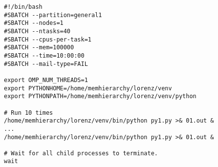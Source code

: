 \begin{lstlisting}[style=bsh]
#!/bin/bash
#SBATCH --partition=general1
#SBATCH --nodes=1
#SBATCH --ntasks=40
#SBATCH --cpus-per-task=1
#SBATCH --mem=100000
#SBATCH --time=10:00:00
#SBATCH --mail-type=FAIL

export OMP_NUM_THREADS=1
export PYTHONHOME=/home/memhierarchy/lorenz/venv
export PYTHONPATH=/home/memhierarchy/lorenz/venv/python

# Run 10 times
/home/memhierarchy/lorenz/venv/bin/python py1.py >& 01.out &
...
/home/memhierarchy/lorenz/venv/bin/python py1.py >& 01.out &

# Wait for all child processes to terminate.
wait
\end{lstlisting}